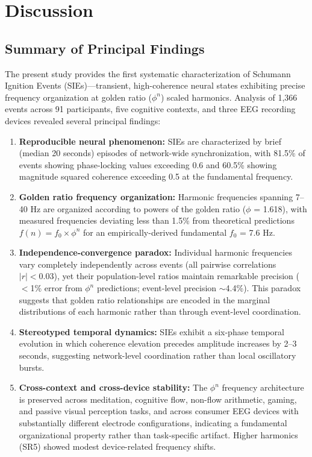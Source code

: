 \documentclass[11pt,a4paper]{article}
\begin{document}
\section{Discussion}

\subsection{Summary of Principal Findings}

The present study provides the first systematic characterization of Schumann Ignition Events (SIEs)—transient, high-coherence neural states exhibiting precise frequency organization at golden ratio ($\phi^n$) scaled harmonics. Analysis of 1,366 events across 91 participants, five cognitive contexts, and three EEG recording devices revealed several principal findings:

\begin{enumerate}
    \item \textbf{Reproducible neural phenomenon:} SIEs are characterized by brief (median 20 seconds) episodes of network-wide synchronization, with 81.5\% of events showing phase-locking values exceeding 0.6 and 60.5\% showing magnitude squared coherence exceeding 0.5 at the fundamental frequency.

    \item \textbf{Golden ratio frequency organization:} Harmonic frequencies spanning 7–40 Hz are organized according to powers of the golden ratio ($\phi$ = 1.618), with measured frequencies deviating less than 1.5\% from theoretical predictions $f(n) = f_0 \times \phi^n$ for an empirically-derived fundamental $f_0$ = 7.6 Hz.

    \item \textbf{Independence-convergence paradox:} Individual harmonic frequencies vary completely independently across events (all pairwise correlations $|r| < 0.03$), yet their population-level ratios maintain remarkable precision ($<$1\% error from $\phi^n$ predictions; event-level precision $\sim$4.4\%). This paradox suggests that golden ratio relationships are encoded in the marginal distributions of each harmonic rather than through event-level coordination.

    \item \textbf{Stereotyped temporal dynamics:} SIEs exhibit a six-phase temporal evolution in which coherence elevation precedes amplitude increases by 2–3 seconds, suggesting network-level coordination rather than local oscillatory bursts.

    \item \textbf{Cross-context and cross-device stability:} The $\phi^n$ frequency architecture is preserved across meditation, cognitive flow, non-flow arithmetic, gaming, and passive visual perception tasks, and across consumer EEG devices with substantially different electrode configurations, indicating a fundamental organizational property rather than task-specific artifact. Higher harmonics (SR5) showed modest device-related frequency shifts.
\end{enumerate}
\end{document}

